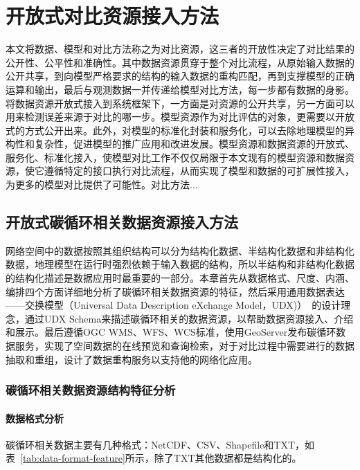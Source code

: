 \chapter{开放式对比资源接入方法}
本文将数据、模型和对比方法称之为对比资源，这三者的开放性决定了对比结果的公开性、公平性和准确性。其中数据资源贯穿于整个对比流程，从原始输入数据的公开共享，到向模型严格要求的结构的输入数据的重构匹配，再到支撑模型的正确运算和输出，最后与观测数据一并传递给模型对比方法，每一步都有数据的身影。将数据资源开放式接入到系统框架下，一方面是对资源的公开共享，另一方面可以用来检测误差来源于对比的哪一步。模型资源作为对比评估的对象，更需要以开放式的方式公开出来。此外，对模型的标准化封装和服务化，可以去除地理模型的异构性和复杂性，促进模型的推广应用和改进发展。模型资源和数据资源的开放式、服务化、标准化接入，使模型对比工作不仅仅局限于本文现有的模型资源和数据资源，使它遵循特定的接口执行对比流程，从而实现了模型和数据的可扩展性接入，为更多的模型对比提供了可能性。对比方法...

\section{开放式碳循环相关数据资源接入方法}
\label{sec:data-desc}
网络空间中的数据按照其组织结构可以分为结构化数据、半结构化数据和非结构化数据，地理模型在运行时强烈依赖于输入数据的结构，所以半结构和非结构化数据的结构化描述是数据应用时最重要的一部分。本章首先从数据格式、尺度、内涵、编排四个方面详细地分析了碳循环相关数据资源的特征，然后采用通用数据表达——交换模型（Universal Data Description eXchange Model，UDX)）~\cite{乐松山2016面向地理模型共享与集成的数据适配方法研究}的设计理念，通过UDX Schema来描述碳循环相关的数据资源，以帮助数据资源接入、介绍和展示。最后遵循OGC WMS、WFS、WCS标准，使用GeoServer发布碳循环数据服务，实现了空间数据的在线预览和查询检索，对于对比过程中需要进行的数据抽取和重组，设计了数据重构服务以支持他的网络化应用。

\subsection{碳循环相关数据资源结构特征分析}

\subsubsection{数据格式分析}
碳循环相关数据主要有几种格式：NetCDF、CSV、Shapefile和TXT，如表~\ref{tab:data-format-feature}所示，除了TXT其他数据都是结构化的。

